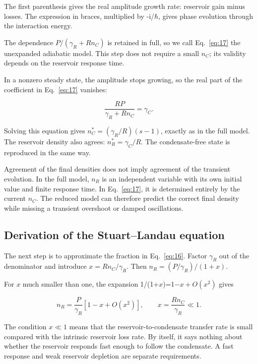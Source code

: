 \documentclass[12pt,a4paper]{article}
\begin{document}
The first parenthesis gives the real amplitude growth rate: reservoir gain minus losses. The expression in braces, multiplied by -i/$\hbar$, gives phase evolution through the interaction energy.

The dependence $P/(\gamma_{R}+R n_{C})$ is retained in full, so we call Eq.~\eqref{eq:17} the unexpanded adiabatic model. This step does not require a small $n_{C}$; its validity depends on the reservoir response time.

In a nonzero steady state, the amplitude stops growing, so the real part of the coefficient in Eq.~\eqref{eq:17} vanishes:

\[
\frac{RP}{\gamma_R+Rn_C}=\gamma_C.
\]

Solving this equation gives $n_{C}^{*}=(\gamma_{R}/R)(s-1)$, exactly as in the full model. The reservoir density also agrees: $n_{R}^{*}=\gamma_{C}/R$. The condensate-free state is reproduced in the same way.

Agreement of the final densities does not imply agreement of the transient evolution. In the full model, $n_{R}$ is an independent variable with its own initial value and finite response time. In Eq.~\eqref{eq:17}, it is determined entirely by the current $n_{C}$. The reduced model can therefore predict the correct final density while missing a transient overshoot or damped oscillations.

\subsection{Derivation of the Stuart--Landau equation}\label{sec:4.3}

The next step is to approximate the fraction in Eq.~\eqref{eq:16}. Factor $\gamma_{R}$ out of the denominator and introduce $x=R n_{C}/\gamma_{R}$. Then $n_{R}=(P/\gamma_{R})/(1+x)$.

For $x$ much smaller than one, the expansion 1/(1+$x$)=1$-x+O(x^{2})$ gives

\begin{equation}\label{eq:18}
n_R=\frac{P}{\gamma_R}[1-x+O(x^2)],\qquad x=\frac{Rn_C}{\gamma_R}\ll1.\end{equation}

The condition $x\ll1$ means that the reservoir-to-condensate transfer rate is small compared with the intrinsic reservoir loss rate. By itself, it says nothing about whether the reservoir responds fast enough to follow the condensate. A fast response and weak reservoir depletion are separate requirements.
\end{document}
